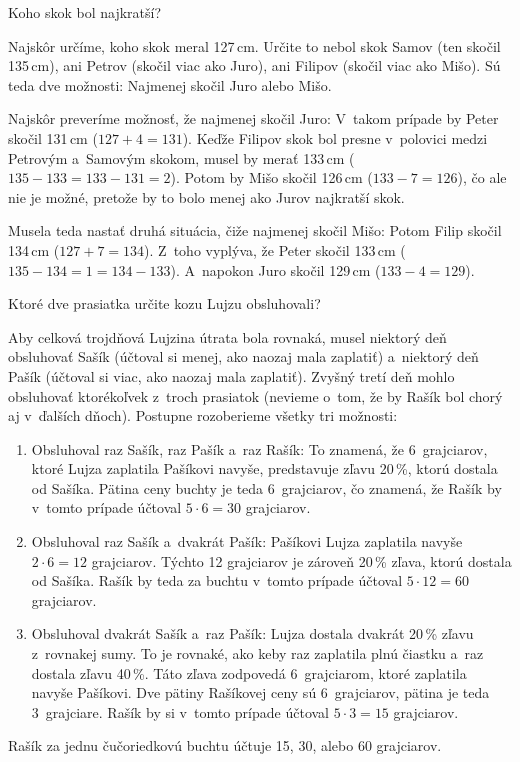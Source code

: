 {%
\napad
Koho skok bol najkratší?

\riesenie
Najskôr určíme, koho skok meral 127\,cm.
Určite to nebol skok Samov (ten skočil 135\,cm), ani Petrov (skočil viac ako
Juro), ani Filipov (skočil viac ako Mišo). Sú teda dve možnosti: Najmenej
skočil Juro alebo Mišo.

Najskôr preveríme možnosť, že najmenej skočil Juro:
V~takom prípade by Peter skočil 131\,cm ($127+4=131$).
Keďže Filipov skok bol presne v~polovici medzi Petrovým a~Samovým skokom,
musel by merať 133\,cm ($135-133=133-131=2$).
Potom by Mišo skočil 126\,cm ($133-7=126$), čo ale nie je možné, pretože by to
bolo menej ako Jurov najkratší skok.
%

Musela teda nastať druhá situácia, čiže najmenej skočil Mišo:
Potom Filip skočil 134\,cm ($127+7=134$).
Z~toho vyplýva, že Peter skočil 133\,cm ($135-134=1=134-133$).
A~napokon Juro skočil 129\,cm ($133-4=129$).
%
}

{%
\napad
Ktoré dve prasiatka určite kozu Lujzu obsluhovali?

\riesenie
Aby celková trojdňová Lujzina útrata bola rovnaká, musel niektorý deň obsluhovať
Sašík (účtoval si menej, ako naozaj mala zaplatiť) a~niektorý deň Pašík
(účtoval si viac, ako naozaj mala zaplatiť). Zvyšný tretí deň mohlo
obsluhovať ktorékoľvek z~troch prasiatok (nevieme o~tom, že by Rašík bol chorý
aj v~ďalších dňoch).
Postupne rozoberieme všetky tri možnosti:
\begin{enumerate}
\item Obsluhoval raz Sašík, raz Pašík a~raz Rašík:
To znamená, že
6~grajciarov, ktoré Lujza zaplatila Pašíkovi navyše,
predstavuje zľavu 20\,\%, ktorú dostala od Sašíka.
Pätina ceny buchty je teda 6~grajciarov, čo znamená, že Rašík by v~tomto
prípade účtoval $5\cdot6=30$ grajciarov.
\item Obsluhoval raz Sašík a~dvakrát Pašík:
Pašíkovi Lujza zaplatila navyše $2\cdot6=12$ grajciarov.
Týchto 12 grajciarov je zároveň 20\,\% zľava, ktorú dostala od Sašíka.
Rašík by teda za buchtu v~tomto prípade účtoval $5\cdot12=60$ grajciarov.
\item Obsluhoval dvakrát Sašík a~raz Pašík:
Lujza dostala dvakrát 20\,\% zľavu z~rovnakej sumy.
To je rovnaké, ako keby raz zaplatila plnú čiastku a~raz dostala
zľavu 40\,\%.
Táto zľava zodpovedá 6~grajciarom, ktoré zaplatila navyše Pašíkovi.
Dve pätiny Rašíkovej ceny sú 6~grajciarov, pätina je teda 3~grajciare.
Rašík by si v~tomto prípade účtoval $5\cdot3=15$ grajciarov.
\end{enumerate}

Rašík za jednu čučoriedkovú buchtu účtuje 15, 30, alebo 60 grajciarov.
}

